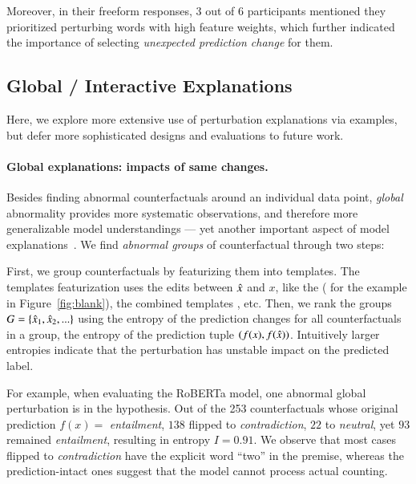Moreover, in their freeform responses, 3 out of 6 participants mentioned they prioritized perturbing words with high feature weights, which further indicated the importance of selecting \emph{unexpected prediction change} for them.




\subsection{Global / Interactive Explanations}
\label{subsec:global_exp}

Here, we explore more extensive use of perturbation explanations via examples, but defer more sophisticated designs and evaluations to future work.

\paragraph{Global explanations: impacts of same changes.}
Besides finding abnormal counterfactuals around an individual data point, \emph{global} abnormality provides more systematic observations, and therefore more generalizable model understandings --- yet another important aspect of model explanations~\cite{miller}.
We find \emph{abnormal groups} of counterfactual through two steps: 

First, we group counterfactuals by featurizing them into templates. 
The templates featurization uses the edits between $\hat{x}$ and $x$, like the \tagstr ( for the example in Figure~\ref{fig:blank}), the combined templates , etc.
Then, we rank the groups $G = \{ \hat{x}_1, \hat{x}_2, ...\}$ using the entropy of the prediction changes for all counterfactuals in a group, \ie the entropy of the prediction tuple $(f(x), f(\hat{x}))$.
Intuitively larger entropies indicate that the perturbation has unstable impact on the predicted label.

For example, when evaluating the \nli RoBERTa model, one abnormal global perturbation is  in the hypothesis.
Out of the 253 counterfactuals whose original prediction $f(x)=$ \emph{entailment}, $138$ flipped to \emph{contradiction}, $22$ to \emph{neutral}, yet $93$ remained \emph{entailment}, resulting in entropy $I=0.91$.
We observe that most cases flipped to \emph{contradiction} have the explicit word ``two'' in the premise, whereas the prediction-intact ones suggest that the model cannot process actual counting.


